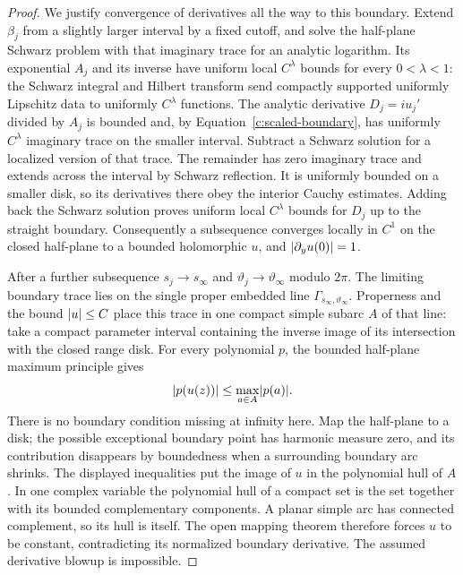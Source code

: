 \begin{proof}
We justify convergence of derivatives all the way to this boundary.
Extend $\beta_j$ from a slightly larger interval by a fixed cutoff, and
solve the half-plane Schwarz problem with that imaginary trace for an
analytic logarithm.  Its exponential $A_j$ and its inverse have uniform
local $C^\lambda$ bounds for every $0<\lambda<1$: the Schwarz integral
and Hilbert transform send compactly supported uniformly Lipschitz data
to uniformly $C^\lambda$ functions.  The analytic derivative
$D_j=i u_j'$ divided by $A_j$ is bounded and, by
Equation~\eqref{c:scaled-boundary}, has uniformly $C^\lambda$ imaginary trace
on the smaller interval.  Subtract a Schwarz solution for a localized
version of that trace.  The remainder has zero imaginary trace and
extends across the interval by Schwarz reflection.  It is uniformly
bounded on a smaller disk, so its derivatives there obey the interior
Cauchy estimates.  Adding back the Schwarz solution proves uniform
local $C^\lambda$ bounds for $D_j$ up to the straight boundary.
Consequently a subsequence converges locally in $C^1$ on the closed
half-plane to a bounded holomorphic $u$, and
$\lvert\partial_yu(0)\rvert=1$.

After a further subsequence $s_j\to s_\infty$ and
$\vartheta_j\to\vartheta_\infty$ modulo $2\pi$.  The limiting boundary
trace lies on the single proper embedded line
$\Gamma_{s_\infty,\vartheta_\infty}$.  Properness and the bound
$\lvert u\rvert\le C$ place this trace in one compact simple subarc $A$ of that
line: take a compact parameter interval containing the inverse image
of its intersection with the closed range disk.  For every polynomial
$p$, the bounded half-plane maximum principle gives
\[
 \lvert p(u(z))\rvert\le\max_{a\in A}\lvert p(a)\rvert.
\]
There is no boundary condition missing at infinity here.  Map the
half-plane to a disk; the possible exceptional boundary point has
harmonic measure zero, and its contribution disappears by boundedness
when a surrounding boundary arc shrinks.  The displayed inequalities
put the image of $u$ in the polynomial hull of $A$.  In one complex
variable the polynomial hull of a compact set is the set together with
its bounded complementary components.  A planar simple arc has
connected complement, so its hull is itself.  The open mapping theorem
therefore forces $u$ to be constant, contradicting its normalized
boundary derivative.  The assumed derivative blowup is impossible.


\end{proof}
